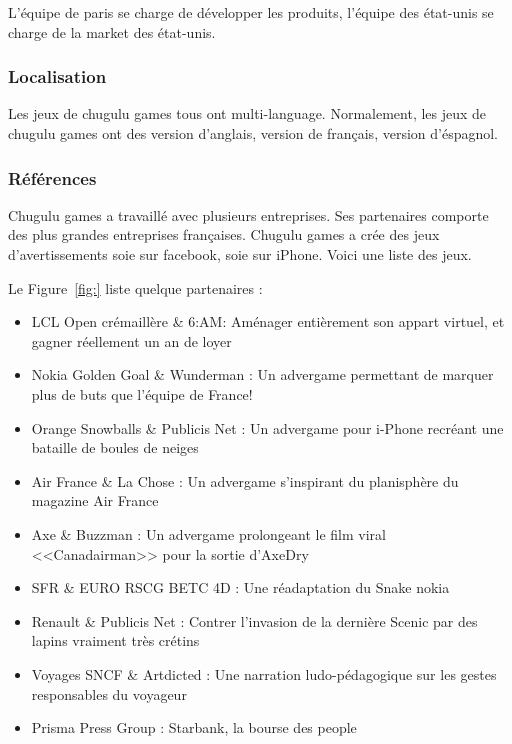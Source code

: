 
L'équipe de paris se charge de développer les produits, l'équipe des état-unis se charge de la market des état-unis. 


\subsubsection{Localisation} %
\label{ssub:subsubsection_name}

Les jeux de chugulu games tous ont multi-language. Normalement, les jeux de chugulu games ont des version d'anglais, version de français, version d'éspagnol. 


\subsubsection{Références} %
\label{ssub:références}

Chugulu games a travaillé avec plusieurs entreprises. Ses partenaires comporte des plus grandes entreprises françaises. Chugulu games a crée des jeux d'avertissements soie sur facebook, soie sur iPhone. Voici une liste des jeux.

Le Figure~\ref{fig:} liste quelque partenaires : 




\begin{itemize}
	\item LCL Open crémaillère \& 6:AM: Aménager entièrement son appart virtuel, et gagner réellement un an de loyer 
	\item Nokia Golden Goal \& Wunderman : Un advergame permettant de marquer plus de buts que l'équipe de France!
	\item Orange Snowballs \& Publicis Net : Un advergame pour i-Phone recréant une bataille de boules de neiges
	\item Air France \& La Chose : Un advergame s'inspirant du planisphère du magazine Air France
	\item Axe \& Buzzman : Un advergame prolongeant le film viral <<Canadairman>> pour la sortie d'AxeDry
	\item SFR \& EURO RSCG BETC 4D : Une réadaptation du Snake nokia 
	\item Renault \& Publicis Net : Contrer l'invasion de la dernière Scenic par des lapins vraiment très crétins
	\item Voyages SNCF \& Artdicted : Une narration ludo-pédagogique sur les gestes responsables du voyageur
	\item Prisma Press Group : Starbank, la bourse des people 
\end{itemize}

